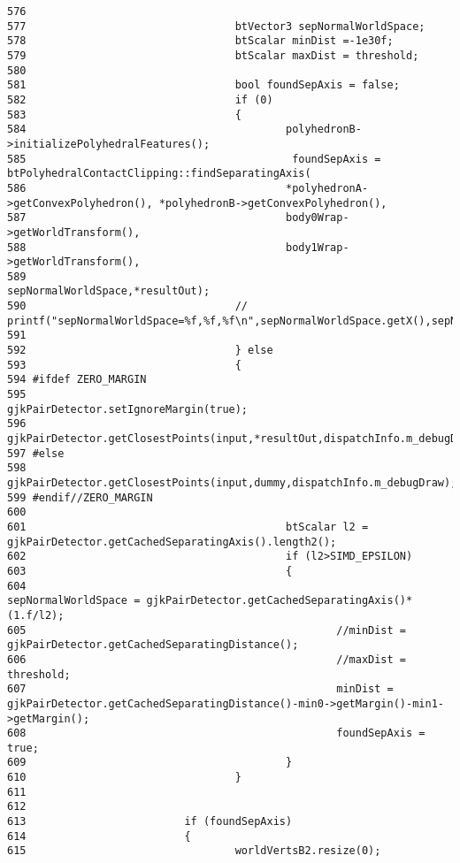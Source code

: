 \begin{Code}
\begin{verbatim}
576 
577                                 btVector3 sepNormalWorldSpace;
578                                 btScalar minDist =-1e30f;
579                                 btScalar maxDist = threshold;
580                                 
581                                 bool foundSepAxis = false;
582                                 if (0)
583                                 {
584                                         polyhedronB->initializePolyhedralFeatures();
585                                          foundSepAxis = btPolyhedralContactClipping::findSeparatingAxis(
586                                         *polyhedronA->getConvexPolyhedron(), *polyhedronB->getConvexPolyhedron(),
587                                         body0Wrap->getWorldTransform(), 
588                                         body1Wrap->getWorldTransform(),
589                                         sepNormalWorldSpace,*resultOut);
590                                 //       printf("sepNormalWorldSpace=%f,%f,%f\n",sepNormalWorldSpace.getX(),sepNormalWorldSpace.getY(),sepNormalWorldSpace.getZ());
591 
592                                 } else
593                                 {
594 #ifdef ZERO_MARGIN
595                                         gjkPairDetector.setIgnoreMargin(true);
596                                         gjkPairDetector.getClosestPoints(input,*resultOut,dispatchInfo.m_debugDraw);
597 #else
598                                         gjkPairDetector.getClosestPoints(input,dummy,dispatchInfo.m_debugDraw);
599 #endif//ZERO_MARGIN
600                                         
601                                         btScalar l2 = gjkPairDetector.getCachedSeparatingAxis().length2();
602                                         if (l2>SIMD_EPSILON)
603                                         {
604                                                 sepNormalWorldSpace = gjkPairDetector.getCachedSeparatingAxis()*(1.f/l2);
605                                                 //minDist = gjkPairDetector.getCachedSeparatingDistance();
606                                                 //maxDist = threshold;
607                                                 minDist = gjkPairDetector.getCachedSeparatingDistance()-min0->getMargin()-min1->getMargin();
608                                                 foundSepAxis = true;
609                                         }
610                                 }
611 
612                                 
613                         if (foundSepAxis)
614                         {
615                                 worldVertsB2.resize(0);

\end{verbatim}
\end{Code}
